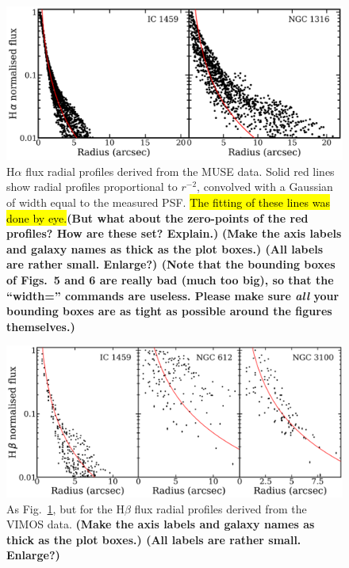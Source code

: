 \documentclass[a4paper,fleqn,usenatbib]{mnras}
\DeclareRobustCommand{\added}[1]{{\sethlcolor{green}\hl{#1}}}
\begin{document}
\begin{figure}
  \centering \includegraphics[width=\columnwidth]{Halpha_profile.png}
  \caption{H$\alpha$ flux radial profiles derived from the MUSE
    data. Solid red lines show radial profiles proportional to
    $r^{-2}$, convolved with a Gaussian of width equal to the measured
    PSF. \added{The fitting of these lines was done by eye.}{\bf (But what about the zero-points of the red profiles? How
      are these set? Explain.)} {\bf (Make the axis labels and galaxy
      names as thick as the plot boxes.) {\bf (All labels are rather
        small. Enlarge?)} {\bf (Note that the bounding boxes of
        Figs.~5 and 6 are really bad (much too big), so that the
        ``width='' commands are useless. Please make sure {\em all}
        your bounding boxes are as tight as possible around the
        figures themselves.)}}
    \label{fig:Ha_profile_MUSE}}
\end{figure}

\begin{figure}
  \centering
  \includegraphics[width=\columnwidth]{Hbeta_profile.png}
  \caption{As Fig.~\ref{fig:Ha_profile_MUSE}, but for the H$\beta$
    flux radial profiles derived from the VIMOS data. {\bf (Make the
      axis labels and galaxy names as thick as the plot boxes.) {\bf
        (All labels are rather small. Enlarge?)}}
    \label{fig:Hb_profile_VIMOS}}
\end{figure}
\end{document}
